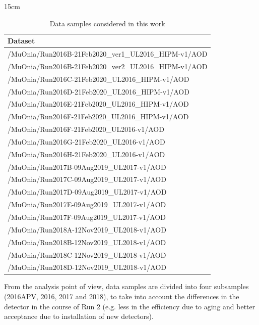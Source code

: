 \begin{table}[!htbp]{15cm}
  \caption{Data samples considered in this work}\label{tab:datasamples}
  \begin{tabular}{ l }
    Dataset                                               \\
    \hline
    /MuOnia/Run2016B-21Feb2020\_ver1\_UL2016\_HIPM-v1/AOD \\
    /MuOnia/Run2016B-21Feb2020\_ver2\_UL2016\_HIPM-v1/AOD \\
    /MuOnia/Run2016C-21Feb2020\_UL2016\_HIPM-v1/AOD       \\
    /MuOnia/Run2016D-21Feb2020\_UL2016\_HIPM-v1/AOD       \\
    /MuOnia/Run2016E-21Feb2020\_UL2016\_HIPM-v1/AOD       \\
    /MuOnia/Run2016F-21Feb2020\_UL2016\_HIPM-v1/AOD       \\
    \hline
    /MuOnia/Run2016F-21Feb2020\_UL2016-v1/AOD             \\
    /MuOnia/Run2016G-21Feb2020\_UL2016-v1/AOD             \\
    /MuOnia/Run2016H-21Feb2020\_UL2016-v1/AOD             \\
    \hline
    /MuOnia/Run2017B-09Aug2019\_UL2017-v1/AOD             \\
    /MuOnia/Run2017C-09Aug2019\_UL2017-v1/AOD             \\
    /MuOnia/Run2017D-09Aug2019\_UL2017-v1/AOD             \\
    /MuOnia/Run2017E-09Aug2019\_UL2017-v1/AOD             \\
    /MuOnia/Run2017F-09Aug2019\_UL2017-v1/AOD             \\
    \hline
    /MuOnia/Run2018A-12Nov2019\_UL2018-v1/AOD             \\
    /MuOnia/Run2018B-12Nov2019\_UL2018-v1/AOD             \\
    /MuOnia/Run2018C-12Nov2019\_UL2018-v1/AOD             \\
    /MuOnia/Run2018D-12Nov2019\_UL2018-v1/AOD             \\
  \end{tabular}
\end{table}

From the analysis point of view, data samples are divided into four subsamples (2016APV, 2016, 2017 and 2018), to take into account the differences in the detector in the course of Run 2 (e.g. less in the efficiency due to aging and better acceptance due to installation of new detectors).

